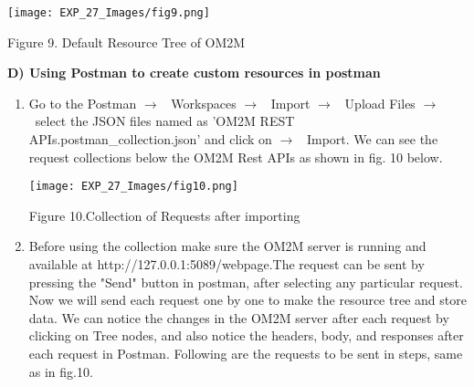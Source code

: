 \documentclass[12pt,a4paper]{article}
\begin{document}
\begin{justify}
\begin{enumerate}
\begin{center} 
\texttt{[image: EXP\_27\_Images/fig9.png]}
\end{center}
\vspace{-7mm}
\begin{center} {Figure 9. Default Resource Tree of OM2M}\end{center} 
\end{enumerate}

\vspace{3cm}
\noindent \textbf{D)	Using Postman to create custom resources in postman}
\vspace{-3mm}
\begin{enumerate}
\item  Go to the Postman $ \rightarrow $ \ Workspaces $ \rightarrow $ \ Import $ \rightarrow $ \  Upload Files $ \rightarrow $ \ select the JSON files named as 'OM2M REST APIs.postman\_collection.json' and click on $ \rightarrow $ \ Import. We can see the request collections below the OM2M Rest APIs as shown in fig. 10 below.
    
    \begin{center} 
    \texttt{[image: EXP\_27\_Images/fig10.png]}
    \end{center}
    \vspace{-7mm}
    \begin{center} {Figure 10.Collection of Requests after importing}\end{center} 
    
\item  Before using the collection make sure the OM2M server is running and available at http://127.0.0.1:5089/webpage.The request can be sent by pressing the "Send" button in postman, after selecting any particular request. Now we will send each request one by one to make the resource tree and store data. We can notice the changes in the OM2M server after each request by clicking on Tree nodes, and also notice the headers, body, and responses after each request in Postman. Following are the requests to be sent in steps, same as in fig.10.


\end{enumerate}
\end{justify}
\end{document}
